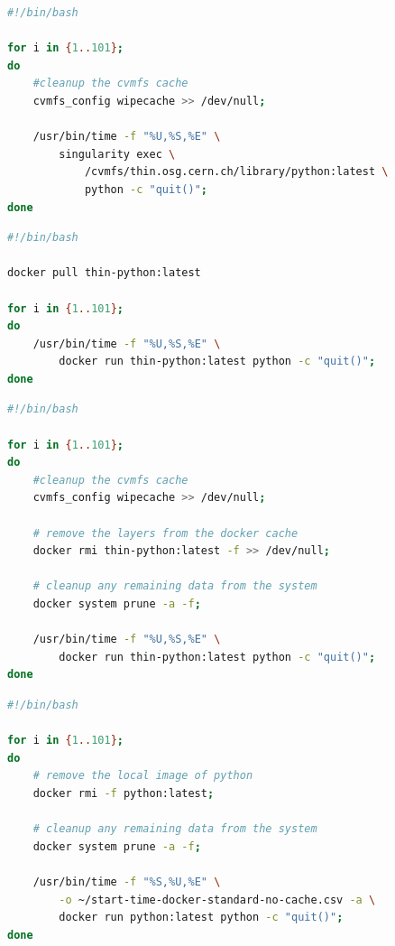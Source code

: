 \begin{lstlisting}[language=bash,
    caption={Script used to capture the startup time of singularity with image hostes in CVMFS without cache}]
#!/bin/bash

for i in {1..101}; 
do 
    #cleanup the cvmfs cache
    cvmfs_config wipecache >> /dev/null; 
    
    /usr/bin/time -f "%U,%S,%E" \
        singularity exec \
            /cvmfs/thin.osg.cern.ch/library/python:latest \
            python -c "quit()"; 
done
\end{lstlisting}


\begin{lstlisting}[language=bash,
    caption={Script used to capture the startup time of docker thin-images using both CVMFS and Docker cache}]
#!/bin/bash

docker pull thin-python:latest

for i in {1..101}; 
do 
    /usr/bin/time -f "%U,%S,%E" \
        docker run thin-python:latest python -c "quit()"; 
done
\end{lstlisting}



\begin{lstlisting}[language=bash,
    caption={Script used to capture the startup time of docker thin-images without Docker nor CVMFS cache}]
#!/bin/bash

for i in {1..101}; 
do 
    #cleanup the cvmfs cache
    cvmfs_config wipecache >> /dev/null; 
    
    # remove the layers from the docker cache
    docker rmi thin-python:latest -f >> /dev/null; 
    
    # cleanup any remaining data from the system
    docker system prune -a -f; 

    /usr/bin/time -f "%U,%S,%E" \
        docker run thin-python:latest python -c "quit()"; 
done
\end{lstlisting}




\begin{lstlisting}[language=bash,
caption={Script used to capture the startup time of Docker standard images without Docker cache}]
#!/bin/bash

for i in {1..101}; 
do 
    # remove the local image of python
    docker rmi -f python:latest; 

    # cleanup any remaining data from the system
    docker system prune -a -f; 
    
    /usr/bin/time -f "%S,%U,%E" \
        -o ~/start-time-docker-standard-no-cache.csv -a \
        docker run python:latest python -c "quit()"; 
done
\end{lstlisting}


